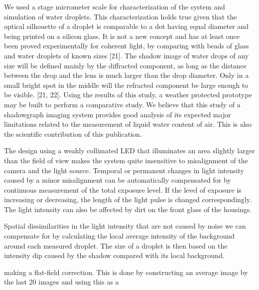 We used a stage micrometer scale for characterization of the system and simulation of water droplets. This characterization holds true given that the optical silhouette of a droplet is comparable to a dot having equal diameter and being printed on a silicon glass. It is not a new concept and has at least once been proved experimentally for coherent light, by comparing with beads of glass and water droplets of known sizes [21]. The shadow image of water drops of any size will be defined mainly by the diffracted component, as long as the distance between the drop and the lens is much larger than the drop diameter. Only in a small bright spot in the middle will the refracted component be large enough to be visible. [21, 22]. 
Using the results of this study, a weather protected prototype may be built to perform a comparative study.
We believe that this study of a shadowgraph imaging system provides good analysis of its expected major limitations related to the measurement of liquid water content of air. This is also the scientific contribution of this publication. 


The design using a weakly collimated LED that illuminates an area slightly larger than the field of view makes the system quite insensitive to misalignment of the camera and the light source. Temporal or permanent changes in light intensity caused by a minor misalignment can be automatically compensated for by continuous measurement of the total exposure level. If the level of exposure is increasing or decreasing, the length of the light pulse is changed correspondingly. The light intensity can also be affected by dirt on the front glass of the housings. 

Spatial dissimilarities in the light intensity that are not caused by noise we can compensate for by calculating the local average intensity of the background around each measured droplet. The size of a droplet is then based on the intensity dip caused by the shadow compared with its local background.


making a flat-field correction. This is done by constructing an average image by the last 20 images and using this as a 





